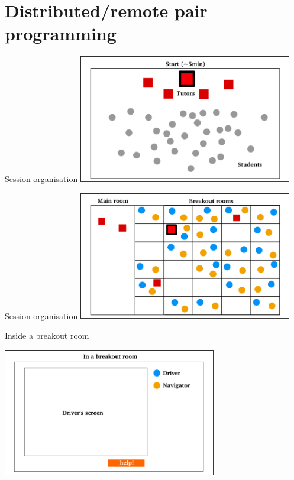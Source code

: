 \documentclass[aspectratio=169, 12pt]{beamer}
\begin{document}
\section{Distributed/remote pair programming}

\begin{frame}{Session organisation}
    \centering
    \includegraphics[width=0.7\textwidth]{graphics/pairprog_3.png}
\end{frame}

\begin{frame}{Session organisation}
    \centering
    \includegraphics[width=0.7\textwidth]{graphics/pairprog_4.png}
\end{frame}

\begin{frame}{Inside a breakout room}
    \begin{center}
    \includegraphics[width=0.7\textwidth]{graphics/pairprog_5.png}
    \end{center}
\end{frame}
\end{document}
